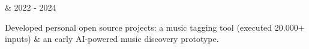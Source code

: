 

\begin{cventries}

  \cventrythin
    { \& } %
    {2022 - 2024} %
    {
          \begin{cvitems} %
	        \item {Developed personal open source projects: a music tagging tool (executed 20.000+ inputs) \& an early AI-powered music discovery prototype.}
	      \end{cvitems}
    }










\end{cventries}
